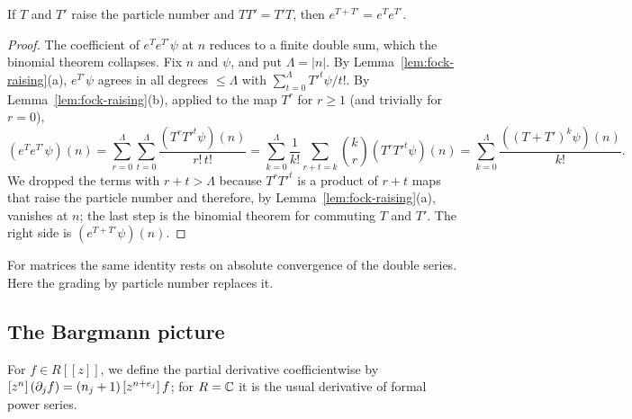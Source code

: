 \begin{theorem}\label{thm:fock-explaw}
If $T$ and $T'$ raise the particle number and $TT'=T'T$, then $e^{T+T'}=e^Te^{T'}$.
\end{theorem}

\begin{proof}
 The coefficient of $e^Te^{T'}\psi$ at
$n$ reduces to a finite double sum, which the binomial theorem collapses. Fix $n$ and $\psi$,
and put $\Lambda=\lvert n\rvert$. By Lemma~\ref{lem:fock-raising}(a), $e^{T'}\psi$ agrees in all
degrees $\le\Lambda$ with $\sum_{t=0}^\Lambda T'^t\psi/t!$. By Lemma~\ref{lem:fock-raising}(b),
applied to the map $T^r$ for $r\ge1$ (and trivially for $r=0$),
\[
 (e^Te^{T'}\psi)(n)=\sum_{r=0}^\Lambda\sum_{t=0}^\Lambda\frac{(T^rT'^t\psi)(n)}{r!\,t!}
 =\sum_{k=0}^\Lambda\frac1{k!}\sum_{r+t=k}\binom kr(T^rT'^t\psi)(n)
 =\sum_{k=0}^\Lambda\frac{((T+T')^k\psi)(n)}{k!}.
\]
We dropped the terms with $r+t>\Lambda$ because $T^rT'^t$ is a product of $r+t$ maps that raise the particle number and
therefore, by Lemma~\ref{lem:fock-raising}(a), vanishes at $n$; the last step is the
binomial theorem for commuting $T$ and $T'$. The right side is $(e^{T+T'}\psi)(n)$.
\end{proof}

For matrices the same identity rests on absolute convergence of the double series. Here the
grading by particle number replaces it. 

\subsection{The Bargmann picture}

 For $f\in R[[z]]$, we define the partial derivative coefficientwise by
$[z^{n}]\,(\partial_jf)=(n_j+1)\,[z^{n+e_j}]\,f$; for $R=\mathbb C$ it is the usual derivative of
formal power series.

